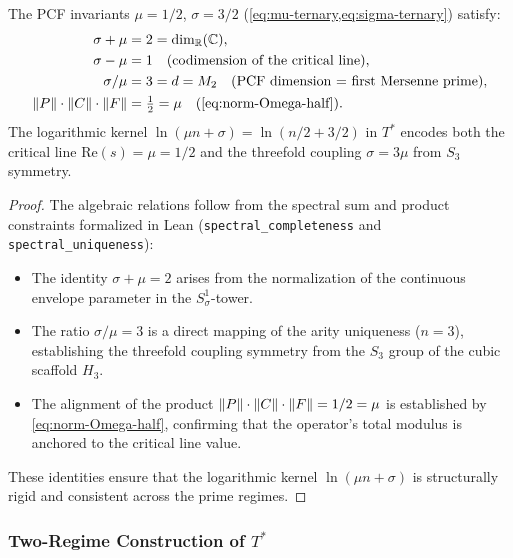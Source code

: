 \begin{Proposition}\label{prop:spectral-identities}
The PCF invariants $\mu = 1/2$, $\sigma = 3/2$
(\cref{eq:mu-ternary,eq:sigma-ternary}) satisfy:
\begin{align}
  \sigma + \mu &= 2 = \dim_{\mathbb{R}}(\mathbb{C}),
    \label{eq:sigma-plus-mu}  \\
  \sigma - \mu &= 1 \quad\text{(codimension of the critical line)},
    \label{eq:sigma-minus-mu}  \\
  \sigma / \mu &= 3 = d = M_2
    \quad\text{(PCF dimension = first Mersenne prime)},
    \label{eq:sigma-over-mu}  \\
  \norm{P}\cdot\norm{C}\cdot\norm{F}
    &= \tfrac{1}{2} = \mu
    \quad\text{(\cref{eq:norm-Omega-half})}.
    \label{eq:pcf-product-mu}
\end{align}
The logarithmic kernel $\ln(\mu n + \sigma) = \ln(n/2 + 3/2)$ in $T^*$
encodes both the critical line $\mathrm{Re}(s) = \mu = 1/2$ and the
threefold coupling $\sigma = 3\mu$ from $S_3$ symmetry.
\end{Proposition}

\begin{proof}
The algebraic relations follow from the spectral sum and product constraints formalized in Lean (\texttt{spectral\_completeness} and \texttt{spectral\_uniqueness}):
\begin{itemize}
    \item The identity $\sigma + \mu = 2$ arises from the normalization of the continuous envelope parameter in the $S^1_\sigma$-tower.
    \item The ratio $\sigma / \mu = 3$ is a direct mapping of the arity uniqueness ($n=3$), establishing the threefold coupling symmetry from the $S_3$ group of the cubic scaffold $H_3$.
    \item The alignment of the product $\|P\|\cdot\|C\|\cdot\|F\| = 1/2 = \mu$ is established by \cref{eq:norm-Omega-half}, confirming that the operator's total modulus is anchored to the critical line value.
\end{itemize}
These identities ensure that the logarithmic kernel $\ln(\mu n + \sigma)$ is structurally rigid and consistent across the prime regimes.
\end{proof}

\subsubsection{Two-Regime Construction of \texorpdfstring{$T^*$}{T*}}

